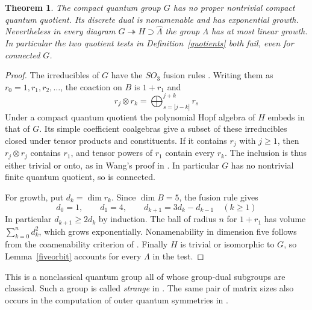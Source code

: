 \documentclass[11pt,a4paper]{article}
\newtheorem{thm}{Theorem}[section]
\theoremstyle{remark}
\begin{document}
\begin{thm}\label{five}
The compact quantum group $G$ has no proper nontrivial compact quantum
quotient. Its discrete dual is nonamenable and has exponential growth.
Nevertheless in every diagram $G\twoheadrightarrow H\supset\widehat\Lambda$
the group $\Lambda$ has at most linear growth. In particular the two
quotient tests in Definition~\ref{quotients} both fail, even for connected $G$.
\end{thm}
\begin{proof}
The irreducibles of $G$ have the $SO_3$ fusion rules \cite{generic}.
Writing them as $r_0=1,r_1,r_2,\ldots$, the coaction on $B$ is $1+r_1$ and
\[
 r_j\otimes r_k=\bigoplus_{s=|j-k|}^{j+k}r_s
\]
Under a compact quantum quotient the polynomial Hopf algebra of $H$
embeds in that of $G$. Its simple coefficient coalgebras give a subset
of these irreducibles closed under tensor products and constituents.
If it contains $r_j$ with $j\ge1$, then $r_j\otimes r_j$ contains $r_1$,
and tensor powers of $r_1$ contain every $r_k$. The inclusion is thus
either trivial or onto, as in Wang's proof in \cite{simple}.
In particular $G$ has no nontrivial finite quantum quotient, so is connected.

For growth, put $d_k=\dim r_k$. Since $\dim B=5$, the fusion rule gives
\[
 d_0=1,\qquad d_1=4,\qquad d_{k+1}=3d_k-d_{k-1}\quad(k\ge1)
\]
In particular $d_{k+1}\ge2d_k$ by induction. The ball of radius $n$ for
$1+r_1$ has volume $\sum_{k=0}^n d_k^2$, which grows exponentially.
Nonamenability in dimension five follows from the coamenability
criterion of \cite{generic}. Finally $H$ is trivial or isomorphic to $G$,
so Lemma~\ref{fiveorbit} accounts for every $\Lambda$ in the test.
\end{proof}

This is a nonclassical quantum group all of whose group-dual subgroups
are classical. Such a group is called \emph{strange} in \cite{bbd}. The same pair of matrix sizes also occurs in the computation of
outer quantum symmetries in \cite[Section~3.3, Example~2]{goswami}.
\end{document}
